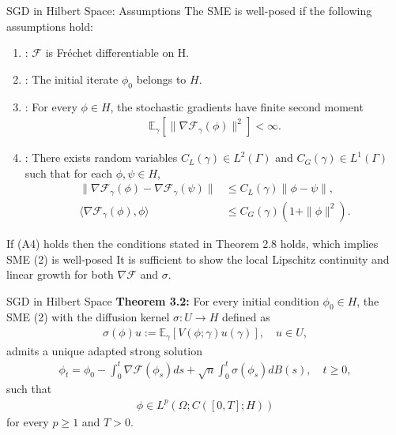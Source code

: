 \documentclass[dvipsnames, handout]{beamer}
\newcommand{\1}{\mathds{1}}	%
\begin{document}
\begin{frame}{SGD in Hilbert Space: Assumptions}
    The SME is well-posed if the following assumptions hold:
    \begin{enumerate}
        \item: $\mathcal{F}$ is Fréchet differentiable on H.
        \item: The initial iterate $\phi_0$ belongs to $H$.
        \item: For every $\phi \in H$, the stochastic gradients have finite second moment
        \begin{align*}
            \mathbb{E}_{\gamma}\left[\|\nabla \mathcal{F}_{\gamma}(\phi)\|^2\right] < \infty.
        \end{align*}
        \item: There exists random variables $C_L(\gamma) \in L^2(\Gamma)$ and $C_G(\gamma) \in L^1(\Gamma)$ such that for each $\phi, \psi \in H$,
        \begin{align*}
            \|\nabla \mathcal{F}_{\gamma}(\phi) - \nabla \mathcal{F}_{\gamma}(\psi) \| &\leq C_L(\gamma) \|\phi - \psi\|,\\ %
            \langle \nabla \mathcal{F}_{\gamma}(\phi), \phi \rangle &\leq C_G(\gamma) (1 + \|\phi\|^2). %
        \end{align*}
    \end{enumerate}
\end{frame}

\begin{frame}{If (A4) holds then the conditions stated in Theorem 2.8 holds, which implies SME (2) is well-posed}
It is sufficient to show the local Lipschitz continuity and linear growth for both $\nabla \mathcal{F}$ and $\sigma$.
    
\end{frame}

\begin{frame}{SGD in Hilbert Space}
    \textbf{Theorem 3.2:} For every initial condition $\phi_0 \in H$, the SME (2) with the diffusion kernel $\sigma: U \rightarrow H$ defined as
    \begin{align*}
        \sigma(\phi)u := \mathbb{E}_{\gamma}[V(\phi; \gamma)u(\gamma)], \quad u \in U,
    \end{align*}
    admits a unique adapted strong solution
    \begin{align*}
        \phi_t = \phi_0 - \int_0^t \nabla \mathcal{F}(\phi_s) ds + \sqrt{n} \int_0^t \sigma(\phi_s) dB(s), \quad t\geq 0,
    \end{align*}
    such that
    \begin{align*}
        \phi \in L^p(\Omega; C([0, T]; H))
    \end{align*}
    for every $p \geq 1$ and $T > 0$.
\end{frame}
\end{document}
